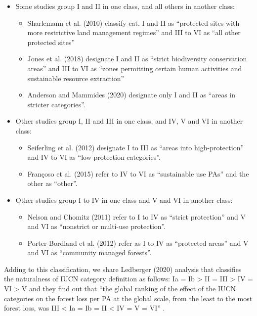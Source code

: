 \documentclass[
  letterpaper,
  DIV=11,
  numbers=noendperiod]{scrartcl}
\begin{document}
\begin{itemize}
\item
  Some studies group I and II in one class, and all others in another
  class:

  \begin{itemize}
  \item
    Sharlemann et al. (2010) classify cat. I and II as ``protected sites
    with more restrictive land management regimes'' and III to VI as
    ``all other protected sites''
  \item
    Jones et al. (2018) designate I and II as ``strict biodiversity
    conservation areas'' and III to VI as ``zones permitting certain
    human activities and sustainable resource extraction''
  \item
    Anderson and Mammides (2020) designate only I and II as ``areas in
    stricter categories''.
  \end{itemize}
\item
  Other studies group I, II and III in one class, and IV, V and VI in
  another class:

  \begin{itemize}
  \item
    Seiferling et al. (2012) designate I to III as ``areas into
    high-protection'' and IV to VI as ``low protection categories''.
  \item
    Françoso et al. (2015) refer to IV to VI as ``sustainable use PAs''
    and the other as ``other''.
  \end{itemize}
\item
  Other studies group I to IV in one class and V and VI in another
  class:

  \begin{itemize}
  \item
    Nelson and Chomitz (2011) refer to I to IV as ``strict protection''
    and V and VI as ``nonstrict or multi-use protection''.
  \item
    Porter-Bordland et al. (2012) refer as I to IV as ``protected
    areas'' and V and VI as ``community managed forests''.
  \end{itemize}
\end{itemize}

Adding to this classification, we share Ledberger (2020) analysis that
classifies the naturalness of IUCN category definition as follows: Ia =
Ib \textgreater{} II = III \textgreater{} IV = VI \textgreater{} V and
they find out that ``the global ranking of the effect of the IUCN
categories on the forest loss per PA at the global scale, from the least
to the most forest loss, was III \textless{} Ia = Ib = II \textless{} IV
= V = VI'' .
\end{document}
